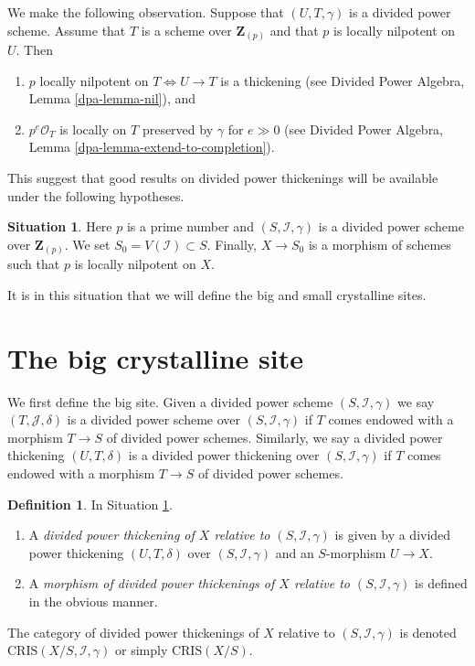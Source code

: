 \documentclass{stacks-project}
\theoremstyle{plain}
\theoremstyle{definition}
\newtheorem{definition}[subsection]{Definition}
\newtheorem{situation}[subsection]{Situation}
\theoremstyle{remark}
\numberwithin{equation}{subsection}
\begin{document}
\noindent
We make the following observation. Suppose that $(U, T, \gamma)$
is a divided power scheme. Assume that $T$ is a scheme over $\mathbf{Z}_{(p)}$
and that $p$ is locally nilpotent on $U$. Then
\begin{enumerate}
\item $p$ locally nilpotent on $T \Leftrightarrow U \to T$
is a thickening (see Divided Power Algebra, Lemma \ref{dpa-lemma-nil}), and
\item $p^e\mathcal{O}_T$ is locally on $T$ preserved by $\gamma$
for $e \gg 0$ (see
Divided Power Algebra, Lemma \ref{dpa-lemma-extend-to-completion}).
\end{enumerate}
This suggest that good results on divided power thickenings will be
available under the following hypotheses.

\begin{situation}
\label{situation-global}
Here $p$ is a prime number and $(S, \mathcal{I}, \gamma)$ is a divided power
scheme over $\mathbf{Z}_{(p)}$. We set $S_0 = V(\mathcal{I}) \subset S$.
Finally, $X \to S_0$ is a morphism of schemes such that $p$ is
locally nilpotent on $X$.
\end{situation}

\noindent
It is in this situation that we will define the big and small
crystalline sites.









\section{The big crystalline site}
\label{section-big-site}

\noindent
We first define the big site. Given a divided power scheme
$(S, \mathcal{I}, \gamma)$ we say $(T, \mathcal{J}, \delta)$ is
a divided power scheme over $(S, \mathcal{I}, \gamma)$ if
$T$ comes endowed with a morphism $T \to S$ of divided power
schemes. Similarly, we say a divided power thickening $(U, T, \delta)$
is a divided power thickening over $(S, \mathcal{I}, \gamma)$
if $T$ comes endowed with a morphism $T \to S$ of divided power
schemes.

\begin{definition}
\label{definition-divided-power-thickening-X}
In Situation \ref{situation-global}.
\begin{enumerate}
\item A {\it divided power thickening of $X$ relative to
$(S, \mathcal{I}, \gamma)$} is given by a divided power thickening
$(U, T, \delta)$ over $(S, \mathcal{I}, \gamma)$
and an $S$-morphism $U \to X$.
\item A {\it morphism of divided power thickenings of $X$
relative to $(S, \mathcal{I}, \gamma)$} is defined in the obvious
manner.
\end{enumerate}
The category of divided power thickenings of $X$ relative to
$(S, \mathcal{I}, \gamma)$ is denoted $\text{CRIS}(X/S, \mathcal{I}, \gamma)$
or simply $\text{CRIS}(X/S)$.
\end{definition}
\end{document}
